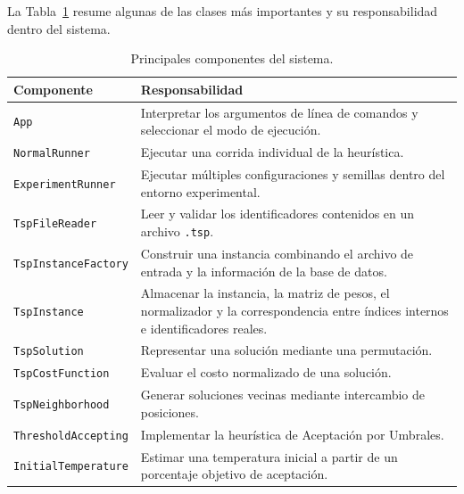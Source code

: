 \documentclass[12pt]{article}
\begin{document}
La Tabla~\ref{tab:componentes-sistema} resume algunas de las clases más
importantes y su responsabilidad dentro del sistema.
\begin{table}[h]
\centering
\small
\begin{tabular}{|p{4.2cm}|p{9cm}|}
\hline
\textbf{Componente} & \textbf{Responsabilidad} \\ \hline

\texttt{App}
&
Interpretar los argumentos de línea de comandos y seleccionar el modo de
ejecución.
\\ \hline

\texttt{NormalRunner}
&
Ejecutar una corrida individual de la heurística.
\\ \hline

\texttt{ExperimentRunner}
&
Ejecutar múltiples configuraciones y semillas dentro del entorno
experimental.
\\ \hline

\texttt{TspFileReader}
&
Leer y validar los identificadores contenidos en un archivo \texttt{.tsp}.
\\ \hline

\texttt{TspInstanceFactory}
&
Construir una instancia combinando el archivo de entrada y la información
de la base de datos.
\\ \hline

\texttt{TspInstance}
&
Almacenar la instancia, la matriz de pesos, el normalizador y la
correspondencia entre índices internos e identificadores reales.
\\ \hline

\texttt{TspSolution}
&
Representar una solución mediante una permutación.
\\ \hline

\texttt{TspCostFunction}
&
Evaluar el costo normalizado de una solución.
\\ \hline

\texttt{TspNeighborhood}
&
Generar soluciones vecinas mediante intercambio de posiciones.
\\ \hline

\texttt{ThresholdAccepting}
&
Implementar la heurística de Aceptación por Umbrales.
\\ \hline
\texttt{InitialTemperature}
&
Estimar una temperatura inicial a partir de un porcentaje objetivo de
aceptación.
\\ \hline

\end{tabular}
\caption{Principales componentes del sistema.}
\label{tab:componentes-sistema}
\end{table}
\end{document}
